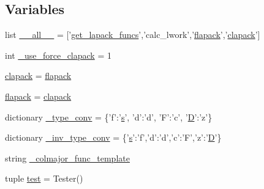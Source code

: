 \subsection*{Variables}
\begin{DoxyCompactItemize}
\item 
list \hyperlink{namespacescipy_1_1lib_1_1lapack_a60c194a2b3886ebf8ee2c9c4c4b8a1a6}{\+\_\+\+\_\+all\+\_\+\+\_\+} = \mbox{[}'\hyperlink{namespacescipy_1_1lib_1_1lapack_a3978edf478323eb87be48df7f590ebcf}{get\+\_\+lapack\+\_\+funcs}','calc\+\_\+lwork','\hyperlink{namespacescipy_1_1lib_1_1lapack_a404c60aedd17287c494cd682f5a44c5d}{flapack}','\hyperlink{namespacescipy_1_1lib_1_1lapack_abc1995130e6d984420c8f61bd7f92d67}{clapack}'\mbox{]}
\item 
int \hyperlink{namespacescipy_1_1lib_1_1lapack_a418c18faa5abfaadbb064e74720fe51c}{\+\_\+use\+\_\+force\+\_\+clapack} = 1
\item 
\hyperlink{namespacescipy_1_1lib_1_1lapack_abc1995130e6d984420c8f61bd7f92d67}{clapack} = \hyperlink{namespacescipy_1_1lib_1_1lapack_a404c60aedd17287c494cd682f5a44c5d}{flapack}
\item 
\hyperlink{namespacescipy_1_1lib_1_1lapack_a404c60aedd17287c494cd682f5a44c5d}{flapack} = \hyperlink{namespacescipy_1_1lib_1_1lapack_abc1995130e6d984420c8f61bd7f92d67}{clapack}
\item 
dictionary \hyperlink{namespacescipy_1_1lib_1_1lapack_a4fa2e27e96f0679788bfb6810fe70c8c}{\+\_\+type\+\_\+conv} = \{'f'\+:'\hyperlink{indexexpr_8h_ae024b0db549122b44c349ae28ec990dc}{s}', 'd'\+:'d', 'F'\+:'c', '\hyperlink{odrpack_8h_a7dae6ea403d00f3687f24a874e67d139}{D}'\+:'z'\}
\item 
dictionary \hyperlink{namespacescipy_1_1lib_1_1lapack_a845c31e7b59895d3172fece0d9eba795}{\+\_\+inv\+\_\+type\+\_\+conv} = \{'\hyperlink{indexexpr_8h_ae024b0db549122b44c349ae28ec990dc}{s}'\+:'f','d'\+:'d','c'\+:'F','z'\+:'\hyperlink{odrpack_8h_a7dae6ea403d00f3687f24a874e67d139}{D}'\}
\item 
string \hyperlink{namespacescipy_1_1lib_1_1lapack_a02a2ae7d53052e444d9c7935c2dc888a}{\+\_\+colmajor\+\_\+func\+\_\+template}
\item 
tuple \hyperlink{namespacescipy_1_1lib_1_1lapack_a9d95f4042d7a0ec233c8598344c6a6cf}{test} = Tester()
\end{DoxyCompactItemize}


